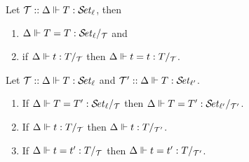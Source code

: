 \documentclass[acmlarge,review,anonymous]{acmart}\settopmatter{printfolios=true}
\begin{document}
\begin{lemma}[Reflexivity]
  Let $\mathcal{T} :: \Delta \Vdash T : {\mathcal{S}\!\mathit{et}_{\ell}}$, then
  \begin{enumerate}
  \item $\Delta \Vdash T = T : {\mathcal{S}\!\mathit{et}_{\ell}} /_{\mathcal{T}}$ and
  \item if $\Delta \Vdash t : T /_{\mathcal{T}}$ then $\Delta \Vdash t = t : T /_{\mathcal{T}}$.
  \end{enumerate}
\end{lemma}




\begin{lemma}
  Let $\mathcal{T} :: \Delta \Vdash T : {\mathcal{S}\!\mathit{et}_{\ell}}$ and $\mathcal{T}' :: \Delta \Vdash T : {\mathcal{S}\!\mathit{et}_{\ell'}}$.
  \begin{enumerate}
  \item If $\Delta \Vdash T = T' : {\mathcal{S}\!\mathit{et}_{\ell}} /_{\mathcal{T}}$ then $\Delta \Vdash T = T' : {\mathcal{S}\!\mathit{et}_{\ell'}} /_{\mathcal{T}'}$.
  \item If $\Delta \Vdash t : T /_{\mathcal{T}}$ then $\Delta \Vdash t : T /_{\mathcal{T}'}$.
  \item If $\Delta \Vdash t = t' : T /_{\mathcal{T}}$ then $\Delta \Vdash t = t' : T /_{\mathcal{T}'}$.
  \end{enumerate}
\end{lemma}
\end{document}
